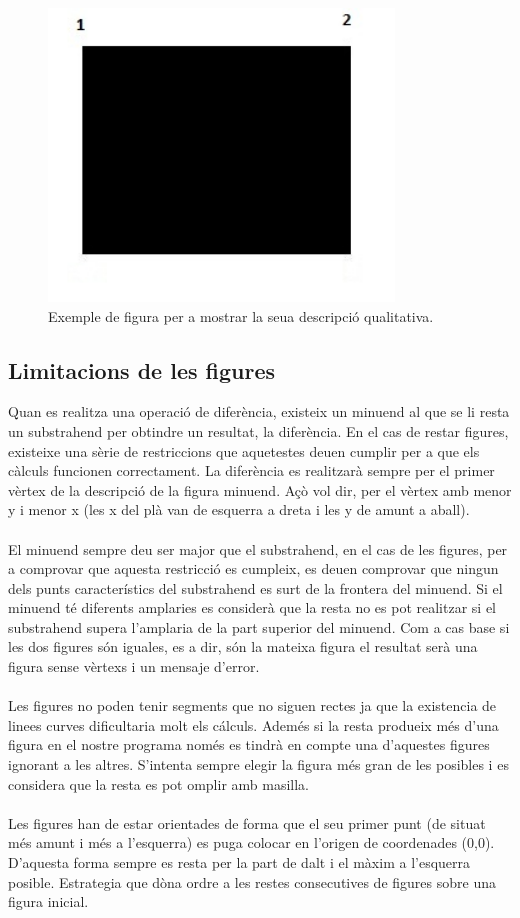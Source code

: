 \documentclass{article}
\begin{document}
\begin{figure}[h]
\centering
\includegraphics[width=260pt]{images/quad_gran.jpg}
\caption {Exemple de figura per a mostrar la seua descripció qualitativa.}
\label {fig:exemple}
\end{figure}

\subsection{Limitacions de les figures}
Quan es realitza una operació de diferència, existeix un minuend al que se li resta un substrahend per obtindre un resultat, la diferència. En el cas de restar figures, existeixe una sèrie de restriccions que aquetestes deuen cumplir per a que els càlculs funcionen correctament.
La diferència es realitzarà sempre per el primer vèrtex de la descripció de la figura minuend. Açò vol dir, per el vèrtex amb menor y i menor x (les x del plà van de esquerra a dreta i les y de amunt a aball).
\\
\\
El minuend sempre deu ser major que el substrahend, en el cas de les figures, per a comprovar que aquesta restricció es cumpleix, es deuen comprovar que ningun dels punts característics del substrahend es surt de la frontera del minuend.
Si el minuend té diferents amplaries es considerà que la resta no es pot realitzar si el substrahend supera l'amplaria de la part superior del minuend. 
Com a cas base si les dos figures són iguales, es a dir, són la mateixa figura el resultat serà una figura sense vèrtexs i un mensaje d'error.
\\
\\
Les figures no poden tenir segments que no siguen rectes ja que la existencia de linees curves dificultaria molt els cálculs.
Ademés si la resta produeix més d'una figura en el nostre programa només es tindrà en compte una d'aquestes figures ignorant a les altres.
S'intenta sempre elegir la figura més gran de les posibles i es considera que la resta es pot omplir amb masilla.
\\
\\
Les figures han de estar orientades de forma que el seu primer punt (de situat més amunt i més a l'esquerra) es puga colocar en l'origen de coordenades (0,0).
D'aquesta forma sempre es resta per la part de dalt i el màxim a l'esquerra posible.
Estrategia que dòna ordre a les restes consecutives de figures sobre una figura inicial.
\\
\end{document}

